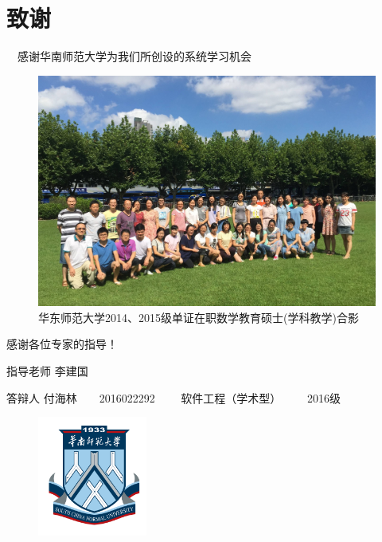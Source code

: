 \documentclass[serif]{beamer}
\begin{document}
    \section{致谢}
    \begin{frame}{$ \quad $感谢华南师范大学为我们所创设的系统学习机会}
      \begin{figure}
      	\centering
      	\includegraphics[scale=0.08]{groupphoto.jpg}
      	\caption{\footnotesize{华东师范大学2014、2015级单证在职数学教育硕士(学科教学)合影}}
      \end{figure}   	
    \end{frame}
    
    \begin{frame}{\hspace{\fill}感谢各位专家的指导！}
       \begin{block}{指导老师}
    	李建国
       \end{block}
       \pause
       \begin{block}{答辩人}
    	付海林$ \qquad $2016022292$ \qquad $ 软件工程（学术型）$ \qquad $ 2016级
       \end{block}
       \pause
       \begin{figure}[b]
    	\centering
    	\includegraphics[width=0.32\textwidth]{scnu0.pdf}
       \end{figure}
    \end{frame}
\end{document}
